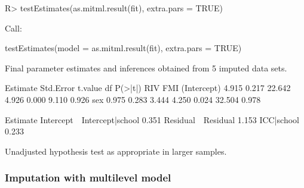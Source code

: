 \documentclass[
]{jss}
\begin{document}
\begin{CodeChunk}
\begin{CodeInput}
R> testEstimates(as.mitml.result(fit), extra.pars = TRUE)
\end{CodeInput}
\begin{CodeOutput}

Call:

testEstimates(model = as.mitml.result(fit), extra.pars = TRUE)

Final parameter estimates and inferences obtained from 5 imputed data sets.

             Estimate Std.Error   t.value        df   P(>|t|)       RIV       FMI 
(Intercept)     4.915     0.217    22.642     4.926     0.000     9.110     0.926 
sex             0.975     0.283     3.444     4.250     0.024    32.504     0.978 

                            Estimate 
Intercept~~Intercept|school    0.351 
Residual~~Residual             1.153 
ICC|school                     0.233 

Unadjusted hypothesis test as appropriate in larger samples.
\end{CodeOutput}
\end{CodeChunk}

\hypertarget{imputation-with-multilevel-model}{%
\subsubsection{Imputation with multilevel
model}\label{imputation-with-multilevel-model}}
\end{document}
